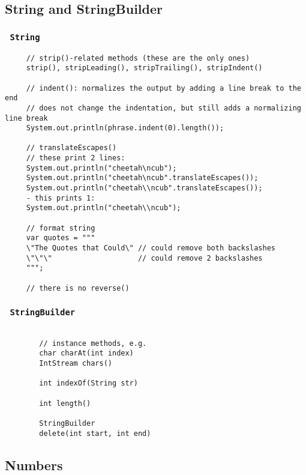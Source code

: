 \documentclass{scrartcl}
\begin{document}
 \subsection{String and StringBuilder}
 \subsubsection{\lstinline$ String $}

    \begin{lstlisting}
     // strip()-related methods (these are the only ones)
     strip(), stripLeading(), stripTrailing(), stripIndent()

     // indent(): normalizes the output by adding a line break to the end
     // does not change the indentation, but still adds a normalizing line break
     System.out.println(phrase.indent(0).length());

     // translateEscapes()
     // these print 2 lines:
     System.out.println("cheetah\ncub");
     System.out.println("cheetah\ncub".translateEscapes());
     System.out.println("cheetah\\ncub".translateEscapes());
     - this prints 1:
     System.out.println("cheetah\\ncub");

     // format string
     var quotes = """
     \"The Quotes that Could\" // could remove both backslashes
     \"\"\"                    // could remove 2 backslashes
     """;

     // there is no reverse()
     \end{lstlisting}

 \subsubsection{\lstinline$ StringBuilder $}

    \begin{lstlisting}

        // instance methods, e.g.
        char charAt(int index)
        IntStream chars()

        int indexOf(String str)

        int length()

        StringBuilder
        delete(int start, int end)
    \end{lstlisting}

\subsection{Numbers}
\end{document}
